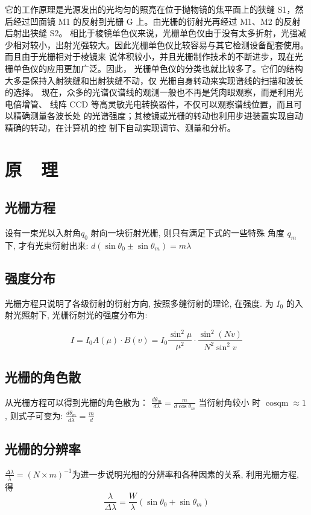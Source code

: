 \documentclass{buaaemp}
\begin{document}
\newpage

它的工作原理是光源发出的光均匀的照亮在位于抛物镜的焦平面上的狭缝 S1，然后经过凹面镜 M1 的反射到光栅 G 上。由光栅的衍射光再经过 M1、M2 的反射后射出狭缝 S2。
相比于棱镜单色仪来说，光栅单色仪由于没有太多折射，光强减少相对较小，出射光强较大。因此光栅单色仪比较容易与其它检测设备配套使用。而且由于光栅相对于棱镜来
说体积较小，并且光栅制作技术的不断进步，现在光栅单色仪的应用更加广泛。因此，
光栅单色仪的分类也就比较多了。它们的结构大多是保持入射狭缝和出射狭缝不动，仅
光栅自身转动来实现谱线的扫描和波长的选择。
现在，众多的光谱仪谱线的观测一般也不再是凭肉眼观察，而是利用光电倍增管、
线阵 CCD 等高灵敏光电转换器件，不仅可以观察谱线位置，而且可以精确测量各波长处
的光谱强度；其棱镜或光栅的转动也利用步进装置实现自动精确的转动，在计算机的控
制下自动实现调节、测量和分析。
\cite{钱建强2016近代物理实验}

\section{原~~理}
\subsection{光栅方程}
设有一束光以入射角$  q_{0}$  射向一块衍射光栅, 则只有满足下式的一些特殊 角度 $ q_{m}$  下, 才有光束衍射出来: $ d\left(\sin \theta_{0} \pm \sin \theta_{m}\right)=m \lambda $
\subsection{强度分布}
光栅方程只说明了各级衍射的衍射方向, 按照多缝衍射的理论, 在强度. 为  $I_{0}$  的入射光照射下, 光栅衍射光的强度分布为:

\begin{equation}
    I=I_{0} A(\mu) \cdot B(v)=I_{0} \frac{\sin ^{2} \mu}{\mu^{2}} \cdot \frac{\sin ^{2}(N v)}{N^{2} \sin ^{2} v}
\end{equation}


\subsection{光栅的角色散}
从光栅方程可以得到光栅的角色散为：  $\frac{d \theta_{m}}{d \lambda}=\frac{m}{d \cos \theta_{m}} $ 当衍射角较小 时  $\operatorname{cosqm} \approx 1$ , 则式子可变为:  $\frac{d \theta_{m}}{d \lambda}=\frac{m}{d} $
 
 \subsection{光栅的分辨率}
 $ \frac{\Delta \lambda}{\lambda}=(N \times m)^{-1}  $为进一步说明光栅的分辨率和各种因素的关系, 利用光栅方程, 得  
 \begin{equation}
     \frac{\lambda}{\Delta \lambda}=\frac{W}{\lambda}\left(\sin \theta_{0}+\sin \theta_{m}\right) 
 \end{equation}
\end{document}
